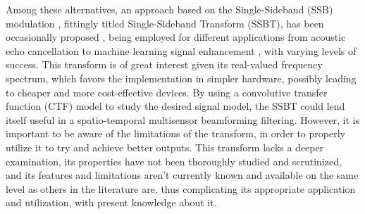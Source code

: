 
Among these alternatives, an approach based on the Single-Sideband (SSB) modulation \cite{chen_hybrid_2021,xing_single_2017}, fittingly titled Single-Sideband Transform (SSBT), has been occasionally proposed \cite{crochiere_multirate_1983,oyzerman_speech_2012,oyzerman_system_2012}, being employed for different applications from acoustic echo cancellation \cite{chin_subband_2001} to machine learning signal enhancement \cite{okamoto_subband_2017}, with varying levels of success. This transform is of great interest given its real-valued frequency spectrum, which favors the implementation in simpler hardware, possibly leading to cheaper and more cost-effective devices. By using a convolutive transfer function (CTF) model \cite{talmon_relative_2009} to study the desired signal model, the SSBT could lend itself useful in a spatio-temporal multisensor beamforming filtering. However, it is important to be aware of the limitations of the transform, in order to properly utilize it to try and achieve better outputs. This transform lacks a deeper examination, its properties have not been thoroughly studied and scrutinized, and its features and limitations aren't currently known and available on the same level as others in the literature are, thus complicating its appropriate application and utilization, with present knowledge about it.


